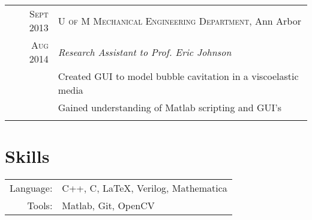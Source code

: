 \documentclass[a4paper,10pt]{article} %
\begin{document}

\begin{tabular}{r|p{13cm}}
\textsc{Sept 2013} & \textsc{U of M Mechanical Engineering Department}, Ann Arbor \\
\textsc{Aug 2014} & \emph{Research Assistant to Prof. Eric Johnson} \\
& \footnotesize{Created GUI to model bubble cavitation in a viscoelastic media} \\
& \footnotesize{Gained understanding of Matlab scripting and GUI's} \\
\multicolumn{2}{c}{} \\
\end{tabular}



\section{Skills}

\begin{tabular}{rl}
Language: & C++, C, \LaTeX, Verilog, Mathematica \\
Tools: & Matlab, Git, OpenCV \\
\end{tabular}

\clearpage %
\end{document}
